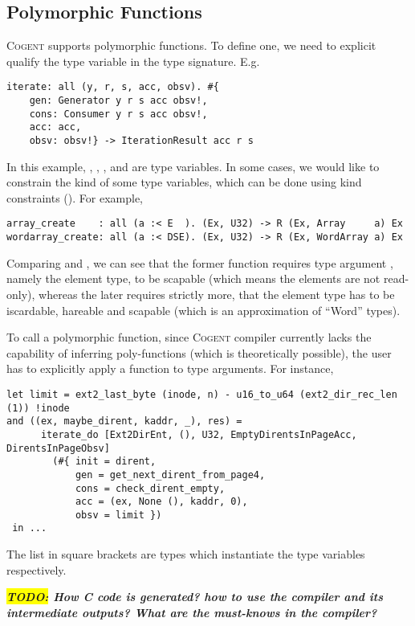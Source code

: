 \documentclass[a4paper]{article}
\newcommand{\TODO}[1]{\textbf{\textsl{\colorbox{yellow}{TODO:} #1}}}
\newcommand{\cogent}{\textsc{Cogent}\xspace}
\newcommand{\Cogent}{\cogent}
\begin{document}
\subsection{Polymorphic Functions}
\Cogent supports polymorphic functions. To define one, we need to explicit qualify the type variable
in the type signature. E.g.\
\begin{lstlisting}[language=Cogent]
iterate: all (y, r, s, acc, obsv). #{
	gen: Generator y r s acc obsv!,
	cons: Consumer y r s acc obsv!,
	acc: acc,
	obsv: obsv!} -> IterationResult acc r s
\end{lstlisting}
In this example, , , ,  and  are type variables. In some cases,
we would like to constrain the kind of some type variables, which can be done using kind constraints (\code{:<}).
For example,
\begin{lstlisting}[language=Cogent]
array_create    : all (a :< E  ). (Ex, U32) -> R (Ex, Array     a) Ex
wordarray_create: all (a :< DSE). (Ex, U32) -> R (Ex, WordArray a) Ex
\end{lstlisting}
Comparing  and , we can see that the former function requires type argument
\code{a}, namely the element type, to be \code{E}scapable (which means the elements are not read-only), whereas
the later requires strictly more, that the element type
has to be iscardable, hareable and scapable (which is an approximation of ``Word'' types).

To call a polymorphic function, since \cogent compiler currently lacks the capability of inferring poly-functions (which is
theoretically possible), the user has to explicitly apply a function to type arguments. For instance,
\begin{lstlisting}[language=Cogent]
let limit = ext2_last_byte (inode, n) - u16_to_u64 (ext2_dir_rec_len (1)) !inode
and ((ex, maybe_dirent, kaddr, _), res) =
      iterate_do [Ext2DirEnt, (), U32, EmptyDirentsInPageAcc, DirentsInPageObsv]
        (#{ init = dirent,
            gen = get_next_dirent_from_page4,
            cons = check_dirent_empty,
            acc = (ex, None (), kaddr, 0),
            obsv = limit })
 in ...
\end{lstlisting}
The list in square brackets are types which instantiate the type variables respectively.

\TODO{How C code is generated? how to use the compiler and its intermediate outputs? What are the must-knows in the compiler?}
\end{document}
